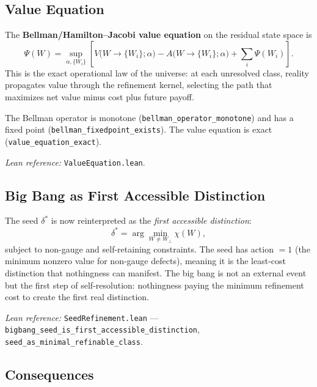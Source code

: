 \subsection{Value Equation}
\label{sec:manifestability:value}

The \textbf{Bellman/Hamilton--Jacobi value equation} on the residual state space is
\begin{equation}
\label{eq:value}
\boxed{
\Psi(W) = \sup_{\alpha, \{W_i\}} \left[
V\bigl(W \to \{W_i\}; \alpha\bigr)
- A\bigl(W \to \{W_i\}; \alpha\bigr)
+ \sum_i \Psi(W_i)
\right].
}
\end{equation}
This is the exact operational law of the universe: at each unresolved class, reality propagates value through the refinement kernel, selecting the path that maximizes net value minus cost plus future payoff.

The Bellman operator is monotone (\texttt{bellman\_operator\_monotone}) and has a fixed point (\texttt{bellman\_fixedpoint\_exists}).  The value equation is exact (\texttt{value\_equation\_exact}).

\emph{Lean reference:} \texttt{ValueEquation.lean}.

\subsection{Big Bang as First Accessible Distinction}
\label{sec:manifestability:bigbang}

The seed $\delta^*$ is now reinterpreted as the \emph{first accessible distinction}:
\[
\delta^* = \arg\min_{W \neq W_\bot} \chi(W),
\]
subject to non-gauge and self-retaining constraints.  The seed has action $= 1$ (the minimum nonzero value for non-gauge defects), meaning it is the least-cost distinction that nothingness can manifest.  The big bang is not an external event but the first step of self-resolution: nothingness paying the minimum refinement cost to create the first real distinction.

\emph{Lean reference:} \texttt{SeedRefinement.lean} --- \texttt{bigbang\_seed\_is\_first\_accessible\_distinction}, \texttt{seed\_as\_minimal\_refinable\_class}.

\subsection{Consequences}
\label{sec:manifestability:consequences}

